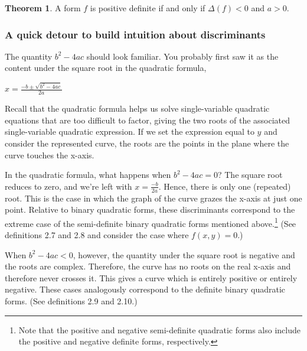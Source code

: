 \documentclass{article}
\theoremstyle{definition}
\theoremstyle{theorem}
\newtheorem{theorem}{Theorem}[section]
\theoremstyle{example}
\theoremstyle{corollary}
\begin{document}
\bigskip

\theoremstyle{theorem}
\begin{theorem}
A form \(f\) is positive definite if and only if \(\Delta(f) < 0\) and \(a > 0\).
\end{theorem}







\bigskip

\subsubsection{A quick detour to build intuition about discriminants}

\bigskip

The quantity \(b^{2} - 4ac\) should look familiar. You probably first saw it as the content under the square root in the quadratic formula,
\begin{center}
\(x = \frac{-b \pm \sqrt{b^{2} - 4ac}}{2a}\)
\end{center}

\bigskip

Recall that the quadratic formula helps us solve single-variable quadratic equations that are too difficult to factor, giving the two roots of the associated single-variable quadratic expression. If we set the expression equal to \(y\) and consider the represented curve, the roots are the points in the plane where the curve touches the x-axis.

\bigskip

In the quadratic formula, what happens when \(b^{2} - 4ac = 0\)? The square root reduces to zero, and we're left with \(x = \frac{-b}{2a}\). Hence, there is only one (repeated) root. This is the case in which the graph of the curve grazes the x-axis at just one point. Relative to binary quadratic forms, these discriminants correspond to the extreme case of the semi-definite binary quadratic forms mentioned above.\footnote{Note that the positive and negative semi-definite quadratic forms also include the positive and negative definite forms, respectively.} (See definitions 2.7 and 2.8 and consider the case where \(f(x, y) = 0\).)

\bigskip

When \(b^{2} - 4ac < 0\), however, the quantity under the square root is negative and the roots are complex. Therefore, the curve has no roots on the real x-axis and therefore never crosses it. This gives a curve which is entirely positive or entirely negative. These cases analogously correspond to the definite binary quadratic forms. (See definitions 2.9 and 2.10.)
\end{document}
